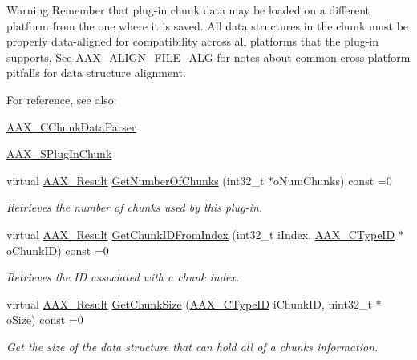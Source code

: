 \begin{Indent}
{\begin{DoxyWarning}{Warning}
Remember that plug-\/in chunk data may be loaded on a different platform from the one where it is saved. All data structures in the chunk must be properly data-\/aligned for compatibility across all platforms that the plug-\/in supports. See \mbox{\hyperlink{a00392_a8fbeac3c5db5ac694e85a021ed74dc9e}{A\+A\+X\+\_\+\+A\+L\+I\+G\+N\+\_\+\+F\+I\+L\+E\+\_\+\+A\+LG}} for notes about common cross-\/platform pitfalls for data structure alignment.
\end{DoxyWarning}
For reference, see also\+: \begin{DoxyItemize}
\item \mbox{\hyperlink{a01461}{A\+A\+X\+\_\+\+C\+Chunk\+Data\+Parser}} \item \mbox{\hyperlink{a01421}{A\+A\+X\+\_\+\+S\+Plug\+In\+Chunk}} \end{DoxyItemize}
}\begin{DoxyCompactItemize}
\item 
virtual \mbox{\hyperlink{a00392_a4d8f69a697df7f70c3a8e9b8ee130d2f}{A\+A\+X\+\_\+\+Result}} \mbox{\hyperlink{a01669_a37e546c6dbb4d5a16fedb9f465de2599}{Get\+Number\+Of\+Chunks}} (int32\+\_\+t $\ast$o\+Num\+Chunks) const =0
\begin{DoxyCompactList}\small\item\em Retrieves the number of chunks used by this plug-\/in. \end{DoxyCompactList}\item 
virtual \mbox{\hyperlink{a00392_a4d8f69a697df7f70c3a8e9b8ee130d2f}{A\+A\+X\+\_\+\+Result}} \mbox{\hyperlink{a01669_a10409113cb781002551b878e4c0edd5a}{Get\+Chunk\+I\+D\+From\+Index}} (int32\+\_\+t i\+Index, \mbox{\hyperlink{a00392_ac678f9c1fbcc26315d209f71a147a175}{A\+A\+X\+\_\+\+C\+Type\+ID}} $\ast$o\+Chunk\+ID) const =0
\begin{DoxyCompactList}\small\item\em Retrieves the ID associated with a chunk index. \end{DoxyCompactList}\item 
virtual \mbox{\hyperlink{a00392_a4d8f69a697df7f70c3a8e9b8ee130d2f}{A\+A\+X\+\_\+\+Result}} \mbox{\hyperlink{a01669_aa986711cd372febcaae803e86ae08f63}{Get\+Chunk\+Size}} (\mbox{\hyperlink{a00392_ac678f9c1fbcc26315d209f71a147a175}{A\+A\+X\+\_\+\+C\+Type\+ID}} i\+Chunk\+ID, uint32\+\_\+t $\ast$o\+Size) const =0
\begin{DoxyCompactList}\small\item\em Get the size of the data structure that can hold all of a chunk\textquotesingle{}s information. \end{DoxyCompactList}\item 

\end{DoxyCompactItemize}
\end{Indent}
